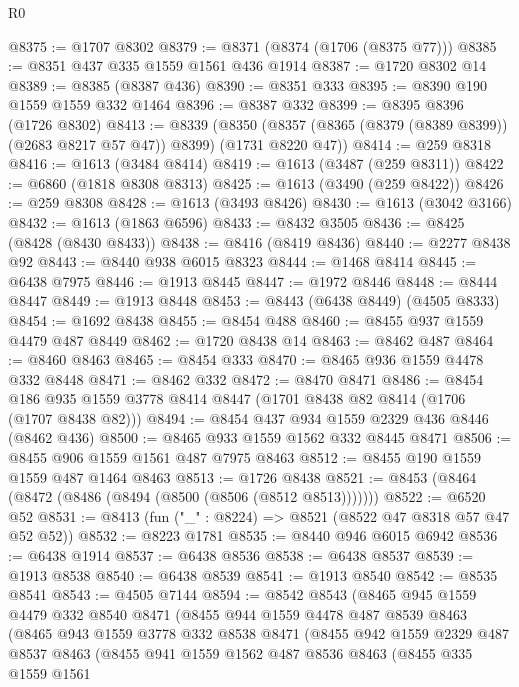 \begin{lexlean}{R0}
\begin{coremodule}
@8375 := @1707 @8302
@8379 := @8371 (@8374 (@1706 (@8375 @77)))
@8385 := @8351 @437 @335 @1559 @1561 @436 @1914
@8387 := @1720 @8302 @14
@8389 := @8385 (@8387 @436)
@8390 := @8351 @333
@8395 := @8390 @190 @1559 @1559 @332 @1464
@8396 := @8387 @332
@8399 := @8395 @8396 (@1726 @8302)
@8413 := @8339
    (@8350 (@8357 (@8365 (@8379 (@8389 @8399)) (@2683 @8217 @57 @47)) @8399) (@1731 @8220 @47))
@8414 := @259 @8318
@8416 := @1613 (@3484 @8414)
@8419 := @1613 (@3487 (@259 @8311))
@8422 := @6860 (@1818 @8308 @8313)
@8425 := @1613 (@3490 (@259 @8422))
@8426 := @259 @8308
@8428 := @1613 (@3493 @8426)
@8430 := @1613 (@3042 @3166)
@8432 := @1613 (@1863 @6596)
@8433 := @8432 @3505
@8436 := @8425 (@8428 (@8430 @8433))
@8438 := @8416 (@8419 @8436)
@8440 := @2277 @8438 @92
@8443 := @8440 @938 @6015 @8323
@8444 := @1468 @8414
@8445 := @6438 @7975
@8446 := @1913 @8445
@8447 := @1972 @8446
@8448 := @8444 @8447
@8449 := @1913 @8448
@8453 := @8443 (@6438 @8449) (@4505 @8333)
@8454 := @1692 @8438
@8455 := @8454 @488
@8460 := @8455 @937 @1559 @4479 @487 @8449
@8462 := @1720 @8438 @14
@8463 := @8462 @487
@8464 := @8460 @8463
@8465 := @8454 @333
@8470 := @8465 @936 @1559 @4478 @332 @8448
@8471 := @8462 @332
@8472 := @8470 @8471
@8486 := @8454 @186 @935 @1559 @3778 @8414 @8447 (@1701 @8438 @82 @8414 (@1706 (@1707 @8438 @82)))
@8494 := @8454 @437 @934 @1559 @2329 @436 @8446 (@8462 @436)
@8500 := @8465 @933 @1559 @1562 @332 @8445 @8471
@8506 := @8455 @906 @1559 @1561 @487 @7975 @8463
@8512 := @8455 @190 @1559 @1559 @487 @1464 @8463
@8513 := @1726 @8438
@8521 := @8453 (@8464 (@8472 (@8486 (@8494 (@8500 (@8506 (@8512 @8513)))))))
@8522 := @6520 @52
@8531 := @8413 (fun ("_" : @8224) => @8521 (@8522 @47 @8318 @57 @47 @52 @52))
@8532 := @8223 @1781
@8535 := @8440 @946 @6015 @6942
@8536 := @6438 @1914
@8537 := @6438 @8536
@8538 := @6438 @8537
@8539 := @1913 @8538
@8540 := @6438 @8539
@8541 := @1913 @8540
@8542 := @8535 @8541
@8543 := @4505 @7144
@8594 := @8542
    @8543
    (@8465
      @945
      @1559
      @4479
      @332
      @8540
      @8471
      (@8455
        @944
        @1559
        @4478
        @487
        @8539
        @8463
        (@8465
          @943
          @1559
          @3778
          @332
          @8538
          @8471
          (@8455
            @942
            @1559
            @2329
            @487
            @8537
            @8463
            (@8455
              @941
              @1559
              @1562
              @487
              @8536
              @8463
              (@8455
                @335
                @1559
                @1561

\end{coremodule}
\end{lexlean}
